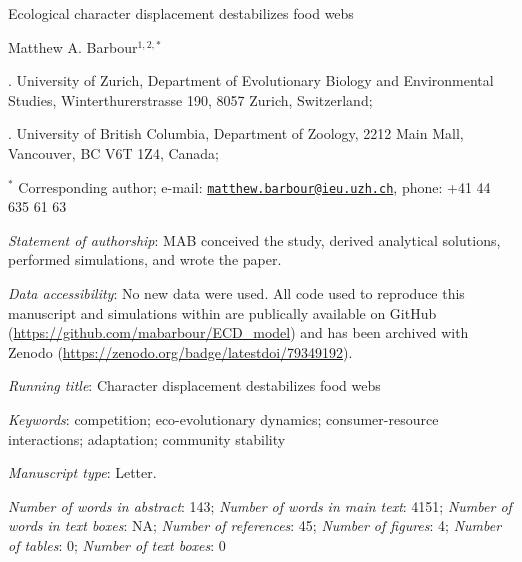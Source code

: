\documentclass[11pt,]{article}
\title{}
\author{}
\date{}
\begin{document}
\vspace*{0.1cm}

\begin{center} \LARGE Ecological character displacement destabilizes food webs \end{center}

\bigskip

\begin{center} \large Matthew A. Barbour$^{1,2,\ast}$ \normalsize \end{center}

\bigskip

. University of Zurich, Department of Evolutionary Biology
and Environmental Studies, Winterthurerstrasse 190, 8057 Zurich,
Switzerland;

. University of British Columbia, Department of Zoology, 2212
Main Mall, Vancouver, BC V6T 1Z4, Canada;

\(^\ast\) Corresponding author; e-mail:
\href{mailto:matthew.barbour@ieu.uzh.ch}{\nolinkurl{matthew.barbour@ieu.uzh.ch}},
phone: +41 44 635 61 63

\bigskip

\emph{Statement of authorship}: MAB conceived the study, derived
analytical solutions, performed simulations, and wrote the paper.

\bigskip

\emph{Data accessibility}: No new data were used. All code used to
reproduce this manuscript and simulations within are publically
available on GitHub (\url{https://github.com/mabarbour/ECD_model}) and
has been archived with Zenodo
(\url{https://zenodo.org/badge/latestdoi/79349192}).

\bigskip

\emph{Running title}: Character displacement destabilizes food webs

\bigskip

\emph{Keywords}: competition; eco-evolutionary dynamics;
consumer-resource interactions; adaptation; community stability

\bigskip

\emph{Manuscript type}: Letter.

\bigskip

\emph{Number of words in abstract}: 143; \emph{Number of words in main
text}: 4151; \emph{Number of words in text boxes}: NA; \emph{Number of
references}: 45; \emph{Number of figures}: 4; \emph{Number of tables}:
0; \emph{Number of text boxes}: 0

\linenumbers{} \modulolinenumbers[3]
\end{document}
